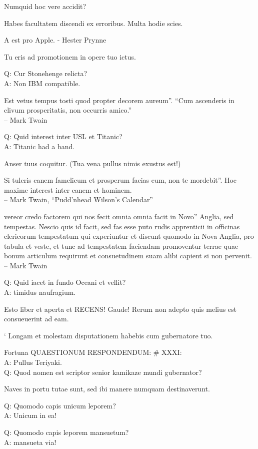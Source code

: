 \documentclass[titlepage,12pt]{memoir}
\begin{document}
Numquid hoc vere accidit?

Habes facultatem discendi ex erroribus. Multa hodie scies.

A est pro Apple. - Hester Prynne

Tu eris ad promotionem in opere tuo ictus.

Q: Cur Stonehenge relicta?\\
A: Non IBM compatible.

Est vetus tempus tosti quod propter decorem aureum”.
“Cum ascenderis in clivum prosperitatis, non occurris amico.”
\\-- Mark Twain

Q: Quid interest inter USL et Titanic?\\
A: Titanic had a band.

Anser tuus coquitur.
(Tua vena pullus nimis exustus est!)

Si tuleris canem famelicum et prosperum facias eum, non te mordebit”.
Hoc maxime interest inter canem et hominem.
\\-- Mark Twain, “Pudd’nhead Wilson’s Calendar”

vereor credo factorem qui nos fecit omnia omnia facit in Novo”
Anglia, sed tempestas. Nescio quis id facit, sed fas esse puto
rudis apprenticii in officinas clericorum tempestatum qui experiuntur et discunt quomodo in
Nova Anglia, pro tabula et veste, et tunc ad tempestatem faciendam promoventur
terrae quae bonum articulum requirunt et consuetudinem suam alibi capient
si non pervenit.
\\-- Mark Twain

Q: Quid iacet in fundo Oceani et vellit?\\
A: timidus naufragium.

Esto liber et aperta et RECENS! Gaude! Rerum non adepto quis melius est
consueuerint ad eam.

‘ Longam et molestam disputationem habebis cum gubernatore tuo.

Fortuna QUAESTIONUM RESPONDENDUM: \# XXXI:\\
A: Pullus Teriyaki.
\\Q: Quod nomen est scriptor senior kamikaze mundi gubernator?

Naves in portu tutae sunt, sed ibi manere numquam destinaverunt.

Q: Quomodo capis unicum leporem?\\
A: Unicum in ea!

Q: Quomodo capis leporem mansuetum?\\
A: mansueta via!
\end{document}
